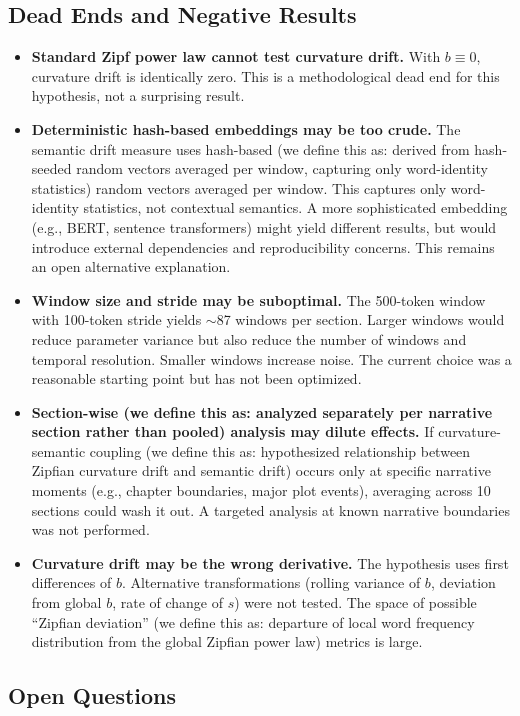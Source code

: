 \documentclass[11pt,letterpaper]{article}
\begin{document}
\subsection{Dead Ends and Negative Results}

\begin{itemize}
\item \textbf{Standard Zipf power law cannot test curvature drift.} With $b \equiv 0$, curvature drift is identically zero. This is a methodological dead end for this hypothesis, not a surprising result.
\item \textbf{Deterministic hash-based embeddings may be too crude.} The semantic drift measure uses hash-based (we define this as: derived from hash-seeded random vectors averaged per window, capturing only word-identity statistics) random vectors averaged per window. This captures only word-identity statistics, not contextual semantics. A more sophisticated embedding (e.g., BERT, sentence transformers) might yield different results, but would introduce external dependencies and reproducibility concerns. This remains an open alternative explanation.
\item \textbf{Window size and stride may be suboptimal.} The 500-token window with 100-token stride yields $\sim$87 windows per section. Larger windows would reduce parameter variance but also reduce the number of windows and temporal resolution. Smaller windows increase noise. The current choice was a reasonable starting point but has not been optimized.
\item \textbf{Section-wise (we define this as: analyzed separately per narrative section rather than pooled) analysis may dilute effects.} If curvature-semantic coupling (we define this as: hypothesized relationship between Zipfian curvature drift and semantic drift) occurs only at specific narrative moments (e.g., chapter boundaries, major plot events), averaging across 10 sections could wash it out. A targeted analysis at known narrative boundaries was not performed.
\item \textbf{Curvature drift may be the wrong derivative.} The hypothesis uses first differences of $b$. Alternative transformations (rolling variance of $b$, deviation from global $b$, rate of change of $s$) were not tested. The space of possible ``Zipfian deviation'' (we define this as: departure of local word frequency distribution from the global Zipfian power law) metrics is large.
\end{itemize}

\subsection{Open Questions}
\end{document}
